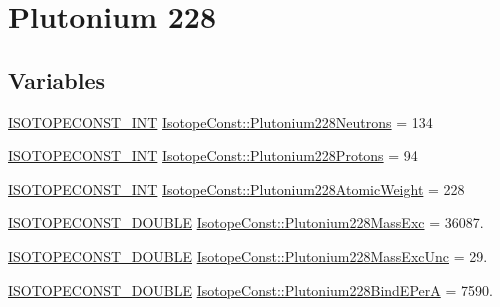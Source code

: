 \hypertarget{group___isotope_const-_plutonium-_pu228}{}\section{Plutonium 228}
\label{group___isotope_const-_plutonium-_pu228}
\subsection*{Variables}
\begin{DoxyCompactItemize}
\item 
\mbox{\hyperlink{group___isotope_const-_macros_ga5f18360b3e99483a35c32d789e62621c}{I\+S\+O\+T\+O\+P\+E\+C\+O\+N\+S\+T\+\_\+\+I\+NT}} \mbox{\hyperlink{group___isotope_const-_plutonium-_pu228_gab5bd7025d2551e1d7c0bdb2a60dbaa82}{Isotope\+Const\+::\+Plutonium228\+Neutrons}} = 134
\item 
\mbox{\hyperlink{group___isotope_const-_macros_ga5f18360b3e99483a35c32d789e62621c}{I\+S\+O\+T\+O\+P\+E\+C\+O\+N\+S\+T\+\_\+\+I\+NT}} \mbox{\hyperlink{group___isotope_const-_plutonium-_pu228_ga23b98c9ffd0481981bbc0026b41c9295}{Isotope\+Const\+::\+Plutonium228\+Protons}} = 94
\item 
\mbox{\hyperlink{group___isotope_const-_macros_ga5f18360b3e99483a35c32d789e62621c}{I\+S\+O\+T\+O\+P\+E\+C\+O\+N\+S\+T\+\_\+\+I\+NT}} \mbox{\hyperlink{group___isotope_const-_plutonium-_pu228_ga66c0e15245a43a94c0ae8886eaabe97c}{Isotope\+Const\+::\+Plutonium228\+Atomic\+Weight}} = 228
\item 
\mbox{\hyperlink{group___isotope_const-_macros_ga8f45a7272ce02c0b4c65c44636ed719a}{I\+S\+O\+T\+O\+P\+E\+C\+O\+N\+S\+T\+\_\+\+D\+O\+U\+B\+LE}} \mbox{\hyperlink{group___isotope_const-_plutonium-_pu228_ga0069bf5f1b1163b22a5db5e1a40ddfa5}{Isotope\+Const\+::\+Plutonium228\+Mass\+Exc}} = 36087.
\item 
\mbox{\hyperlink{group___isotope_const-_macros_ga8f45a7272ce02c0b4c65c44636ed719a}{I\+S\+O\+T\+O\+P\+E\+C\+O\+N\+S\+T\+\_\+\+D\+O\+U\+B\+LE}} \mbox{\hyperlink{group___isotope_const-_plutonium-_pu228_gabb1b5feab487dbce2687d469ebc5dcb7}{Isotope\+Const\+::\+Plutonium228\+Mass\+Exc\+Unc}} = 29.
\item 
\mbox{\hyperlink{group___isotope_const-_macros_ga8f45a7272ce02c0b4c65c44636ed719a}{I\+S\+O\+T\+O\+P\+E\+C\+O\+N\+S\+T\+\_\+\+D\+O\+U\+B\+LE}} \mbox{\hyperlink{group___isotope_const-_plutonium-_pu228_ga99d977008530d12fe222d0cef17d2aa0}{Isotope\+Const\+::\+Plutonium228\+Bind\+E\+PerA}} = 7590.
\item 

\end{DoxyCompactItemize}
